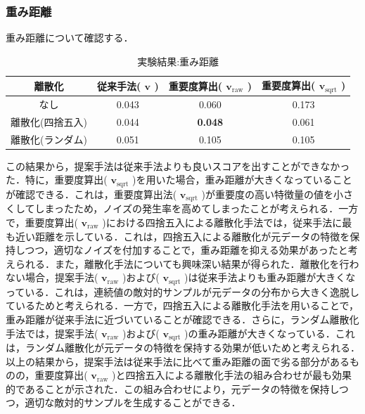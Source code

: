 \subsubsection{重み距離}
重み距離について確認する．
\begin{table}[H]
    \centering
    \caption{実験結果:重み距離}
    \begin{tabular}{|c|c|c|c|} \hline
        離散化 & 従来手法( $\bm{v}$ ) & 重要度算出( $\bm{v}_{\mathrm{raw}}$ ) & 重要度算出( $\bm{v}_{\mathrm{sqrt}}$ ) \\ \hline
        なし & 0.043 & 0.060 & 0.173\\ \hline
        離散化(四捨五入) & 0.044 & \textbf{0.048} & 0.061 \\ \hline
        離散化(ランダム) & 0.051 & 0.105 & 0.105 \\ \hline
    \end{tabular}
\end{table}
この結果から，提案手法は従来手法よりも良いスコアを出すことができなかった．特に，重要度算出( $\bm{v}_{\mathrm{sqrt}}$ )を用いた場合，重み距離が大きくなっていることが確認できる．これは，重要度算出法( $\bm{v}_{\mathrm{sqrt}}$ )が重要度の高い特徴量の値を小さくしてしまったため，ノイズの発生率を高めてしまったことが考えられる．一方で，重要度算出( $\bm{v}_{\mathrm{raw}}$ )における四捨五入による離散化手法では，従来手法に最も近い距離を示している．これは，四捨五入による離散化が元データの特徴を保持しつつ，適切なノイズを付加することで，重み距離を抑える効果があったと考えられる．また，離散化手法についても興味深い結果が得られた．離散化を行わない場合，提案手法( $\bm{v}_{\mathrm{raw}}$ )および( $\bm{v}_{\mathrm{sqrt}}$ )は従来手法よりも重み距離が大きくなっている．これは，連続値の敵対的サンプルが元データの分布から大きく逸脱しているためと考えられる．一方で，四捨五入による離散化手法を用いることで，重み距離が従来手法に近づいていることが確認できる．さらに，ランダム離散化手法では，提案手法( $\bm{v}_{\mathrm{raw}}$ )および( $\bm{v}_{\mathrm{sqrt}}$ )の重み距離が大きくなっている．これは，ランダム離散化が元データの特徴を保持する効果が低いためと考えられる．以上の結果から，提案手法は従来手法に比べて重み距離の面で劣る部分があるものの，重要度算出( $\bm{v}_{\mathrm{raw}}$ )と四捨五入による離散化手法の組み合わせが最も効果的であることが示された．この組み合わせにより，元データの特徴を保持しつつ，適切な敵対的サンプルを生成することができる．

